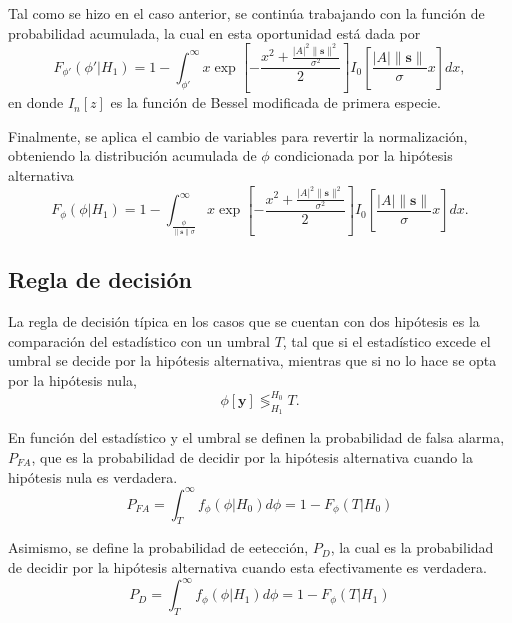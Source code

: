 Tal como se hizo en el caso anterior, se continúa trabajando con la función de probabilidad acumulada, la cual en esta oportunidad está dada por
\begin{equation}
    F_{\phi'}(\phi'|H_1) = 1-\int_{\phi'}^\infty x\exp\left[-\frac{x^2 + \frac{|A|^2\lVert\mathbf{s}\rVert^2}{\sigma^2}}{2}\right]I_0\left[\frac{|A|\lVert\mathbf{s}\rVert}{\sigma} x\right] dx,
\end{equation}
en donde $I_n[z]$ es la función de Bessel modificada de primera especie. 

Finalmente, se aplica el cambio de variables para revertir la normalización, obteniendo la distribución acumulada de $\phi$ condicionada por la hipótesis alternativa
\begin{equation}\label{eq:phi-ante-h1}
    F_\phi(\phi|H_1) = 1-\int_{\frac{\phi}{\lVert\mathbf{s}\rVert\sigma}}^\infty x\exp\left[-\frac{x^2 + \frac{|A|^2\lVert\mathbf{s}\rVert^2}{\sigma^2}}{2}\right]I_0\left[\frac{|A|\lVert\mathbf{s}\rVert}{\sigma} x\right] dx.
\end{equation}


\subsection{Regla de decisión}
\label{Ss:hipotesis-umbral}\label{eq:def-pfa}

La regla de decisión típica en los casos que se cuentan con dos hipótesis es la comparación del estadístico con un umbral $T$, tal que si el estadístico excede el umbral se decide por la hipótesis alternativa, mientras que si no lo hace se opta por la hipótesis nula,
\begin{equation}
    \phi[\mathbf{y}]\mathop{\lessgtr}_{H_1}^{H_0}T.
\end{equation}

En función del estadístico y el umbral se definen la probabilidad de falsa alarma, $P_{FA}$, que es la probabilidad de decidir por la hipótesis alternativa cuando la hipótesis nula es verdadera.
\begin{equation}
    P_{FA} = \int_T^\infty f_\phi(\phi|H_0)d\phi = 1 - F_\phi(T|H_0)
\end{equation}

Asimismo, se define la probabilidad de eetección, $P_D$, la cual es la probabilidad de decidir por la hipótesis alternativa cuando esta efectivamente es verdadera.
\begin{equation}\label{eq:probabilidad-deteccion-def}
    P_{D} = \int_T^\infty f_\phi(\phi|H_1)d\phi = 1 - F_\phi(T|H_1)
\end{equation}

